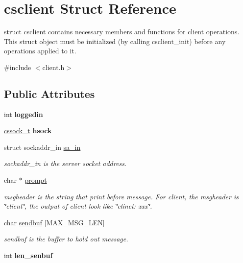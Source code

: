 \hypertarget{structcsclient}{}\section{csclient Struct Reference}
\label{structcsclient}


struct csclient contains necessary members and functions for client operations. This struct object must be initialized (by calling csclient\+\_\+init) before any operations applied to it.  




{\ttfamily \#include $<$client.\+h$>$}

\subsection*{Public Attributes}
\begin{DoxyCompactItemize}
\item 
\hypertarget{structcsclient_aa2665ff9ff09e43acae721376c92b9f4}{}int {\bfseries loggedin}\label{structcsclient_aa2665ff9ff09e43acae721376c92b9f4}

\item 
\hypertarget{structcsclient_ad730beb18ecbbb000950d8e1f7085d85}{}\hyperlink{sock__types_8h_aff065565f761db4433fff15fc7b7c471}{cssock\+\_\+t} {\bfseries hsock}\label{structcsclient_ad730beb18ecbbb000950d8e1f7085d85}

\item 
\hypertarget{structcsclient_a5e7b35f2d6dd38bd473ba94e35cbd9eb}{}struct sockaddr\+\_\+in \hyperlink{structcsclient_a5e7b35f2d6dd38bd473ba94e35cbd9eb}{sa\+\_\+in}\label{structcsclient_a5e7b35f2d6dd38bd473ba94e35cbd9eb}

\begin{DoxyCompactList}\small\item\em sockaddr\+\_\+in is the server socket address. \end{DoxyCompactList}\item 
\hypertarget{structcsclient_a40909df8825a1a5171688d280d98ebdb}{}char $\ast$ \hyperlink{structcsclient_a40909df8825a1a5171688d280d98ebdb}{prompt}\label{structcsclient_a40909df8825a1a5171688d280d98ebdb}

\begin{DoxyCompactList}\small\item\em msgheader is the string that print before message. For client, the msgheader is \char`\"{}client\char`\"{}, the output of client look like \char`\"{}clinet\+: xxx\char`\"{}. \end{DoxyCompactList}\item 
char \hyperlink{structcsclient_a325006ca2b5e74fe78e00847974234e5}{sendbuf} \mbox{[}M\+A\+X\+\_\+\+M\+S\+G\+\_\+\+L\+E\+N\mbox{]}
\begin{DoxyCompactList}\small\item\em sendbuf is the buffer to hold out message. \end{DoxyCompactList}\item 
\hypertarget{structcsclient_a2fd85113ce1bcbea4820f4b43ccdc761}{}int {\bfseries len\+\_\+senbuf}\label{structcsclient_a2fd85113ce1bcbea4820f4b43ccdc761}


\end{DoxyCompactItemize}
